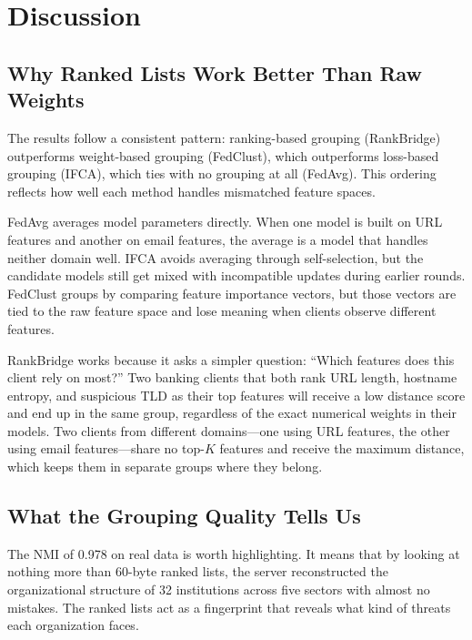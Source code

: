 \documentclass[information,article,submit,pdftex]{mdpi}
\begin{document}
\section{Discussion}\label{sec:discussion}

\subsection{Why Ranked Lists Work Better Than Raw Weights}

The results follow a consistent pattern: ranking-based grouping (RankBridge)
outperforms weight-based grouping (FedClust), which outperforms loss-based
grouping (IFCA), which ties with no grouping at all (FedAvg). This ordering
reflects how well each method handles mismatched feature spaces.

FedAvg averages model parameters directly. When one model is built on URL features
and another on email features, the average is a model that handles neither domain
well. IFCA avoids averaging through self-selection, but the candidate models still
get mixed with incompatible updates during earlier rounds. FedClust groups by
comparing feature importance vectors, but those vectors are tied to the raw
feature space and lose meaning when clients observe different features.

RankBridge works because it asks a simpler question: ``Which features does this
client rely on most?'' Two banking clients that both rank URL length, hostname
entropy, and suspicious TLD as their top features will receive a low distance
score and end up in the same group, regardless of the exact numerical weights in
their models. Two clients from different domains---one using URL features, the
other using email features---share no top-$K$ features and receive the maximum
distance, which keeps them in separate groups where they belong.

\subsection{What the Grouping Quality Tells Us}

The NMI of 0.978 on real data is worth highlighting. It means that by looking at
nothing more than 60-byte ranked lists, the server reconstructed the
organizational structure of 32 institutions across five sectors with almost no
mistakes. The ranked lists act as a fingerprint that reveals what kind of threats
each organization faces.
\end{document}
